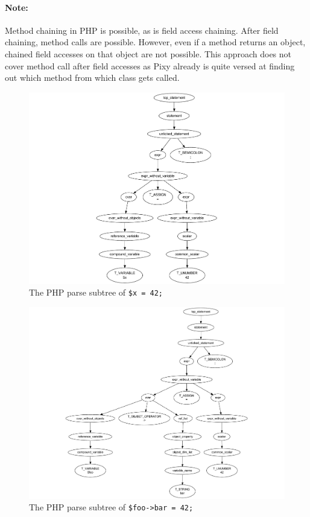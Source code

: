 \paragraph{Note:} Method chaining in PHP is possible, as is field access chaining. After field chaining, method calls are possible. However, even if a method returns an object, chained field accesses on that object are not possible. This approach does not cover method call after field accesses as Pixy already is quite versed at finding out which method from which class gets called.


\begin{figure}[htb]
  \begin{center}
    \includegraphics[trim = 30mm 0mm 50mm 10mm, scale=0.8]{images/simple-variable-assignment}
   \caption{The PHP parse subtree of \texttt{\$x = 42;}}
   \label{fig:simple-variable-assignment}
  \end{center}
\end{figure}

\begin{figure}[htb]
  \begin{center}
    \includegraphics[trim = 60mm 0mm 0mm 20mm, scale=0.8]{images/one-level-field-access-left}
   \caption{The PHP parse subtree of \texttt{\$foo->bar = 42;}}
   \label{fig:one-level-field-access-left}
  \end{center}
\end{figure}

